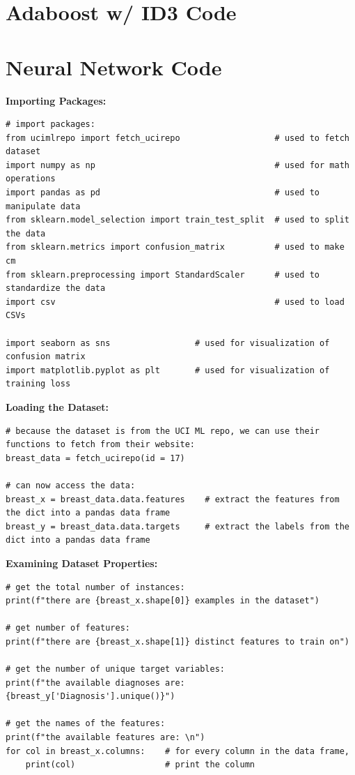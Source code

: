 \documentclass[a4paper]{article}
\begin{document}
\renewcommand{\thesection}{Appendix \Alph{section}: \hspace{-4mm}}
\setcounter{section}{0} %

\newpage
\section{Adaboost w/ ID3 Code}

\newpage
\section{Neural Network Code}
\textbf{Importing Packages:}
\begin{lstlisting}[basicstyle= \scriptsize]
# import packages:
from ucimlrepo import fetch_ucirepo                   # used to fetch dataset
import numpy as np                                    # used for math operations
import pandas as pd                                   # used to manipulate data
from sklearn.model_selection import train_test_split  # used to split the data
from sklearn.metrics import confusion_matrix          # used to make cm
from sklearn.preprocessing import StandardScaler      # used to standardize the data
import csv                                            # used to load CSVs

import seaborn as sns                 # used for visualization of confusion matrix
import matplotlib.pyplot as plt       # used for visualization of training loss
\end{lstlisting} 

\textbf{Loading the Dataset:}
\begin{lstlisting}[basicstyle= \scriptsize]
# because the dataset is from the UCI ML repo, we can use their functions to fetch from their website:
breast_data = fetch_ucirepo(id = 17)

# can now access the data:
breast_x = breast_data.data.features    # extract the features from the dict into a pandas data frame
breast_y = breast_data.data.targets     # extract the labels from the dict into a pandas data frame
\end{lstlisting}

\textbf{Examining Dataset Properties:}
\begin{lstlisting}[basicstyle= \scriptsize]
# get the total number of instances:
print(f"there are {breast_x.shape[0]} examples in the dataset")

# get number of features:
print(f"there are {breast_x.shape[1]} distinct features to train on")

# get the number of unique target variables:
print(f"the available diagnoses are: {breast_y['Diagnosis'].unique()}")

# get the names of the features:
print(f"the available features are: \n")
for col in breast_x.columns:    # for every column in the data frame, 
    print(col)                  # print the column    
\end{lstlisting}
\end{document}

